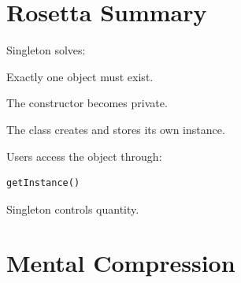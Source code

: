 \documentclass[11pt,a4paper]{book}
\begin{document}

\section{Rosetta Summary}

\begin{rosettarule}

Singleton solves:

\begin{center}
Exactly one object must exist.
\end{center}

\end{rosettarule}

\begin{rosettarule}

The constructor becomes private.

\end{rosettarule}

\begin{rosettarule}

The class creates and stores its own instance.

\end{rosettarule}

\begin{rosettarule}

Users access the object through:

\begin{verbatim}
getInstance()
\end{verbatim}

\end{rosettarule}

\begin{rosettarule}

Singleton controls quantity.

\end{rosettarule}


\section{Mental Compression}
\end{document}
